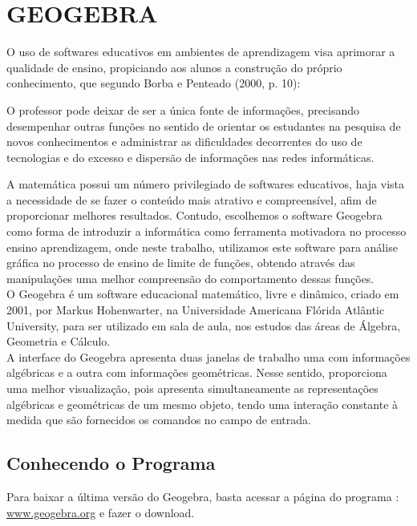 \chapter{GEOGEBRA}
O uso de softwares educativos em ambientes de aprendizagem visa aprimorar a qualidade de ensino, propiciando aos alunos a construção do próprio conhecimento, que segundo Borba e Penteado (2000, p. 10):
\begin{citacao}
O professor pode deixar de ser a única fonte de informações, precisando desempenhar outras funções no sentido de orientar os estudantes na pesquisa de novos conhecimentos e administrar as dificuldades decorrentes do uso de tecnologias e do excesso e dispersão de informações nas redes informáticas.
\end{citacao}
\quad A matemática possui um número privilegiado de softwares educativos, haja vista a necessidade  de se fazer o conteúdo mais atrativo e compreensível, afim de proporcionar melhores resultados. Contudo, escolhemos o software Geogebra como forma de introduzir a informática como ferramenta motivadora no processo ensino aprendizagem, onde neste trabalho, utilizamos este software para análise gráfica no processo de ensino de limite de funções, obtendo através das manipulações uma melhor compreensão do comportamento dessas funções.\\

\quad O Geogebra é um software educacional matemático, livre e dinâmico, criado em 2001, por Markus Hohenwarter, na Universidade Americana Flórida Atlântic University, para ser utilizado em sala de aula, nos estudos das áreas de Álgebra, Geometria e Cálculo.\\


\quad A interface do Geogebra apresenta duas janelas de trabalho uma com informações algébricas e a outra com informações geométricas. Nesse sentido, proporciona uma melhor visualização, pois apresenta simultaneamente as representações algébricas e geométricas de um mesmo objeto, tendo uma interação constante à medida que são fornecidos os comandos no campo de entrada. 
\section{Conhecendo o Programa}
Para baixar a última versão do Geogebra, basta acessar a página do programa :\url{ www.geogebra.org} e fazer o download.

